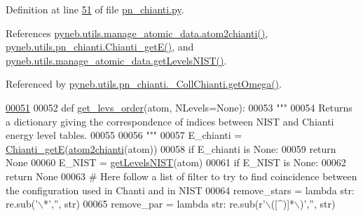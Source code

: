Definition at line \hyperlink{pn__chianti_8py_source_l00051}{51} of file \hyperlink{pn__chianti_8py_source}{pn\-\_\-chianti.\-py}.



References \hyperlink{manage__atomic__data_8py_source_l00009}{pyneb.\-utils.\-manage\-\_\-atomic\-\_\-data.\-atom2chianti()}, \hyperlink{pn__chianti_8py_source_l00030}{pyneb.\-utils.\-pn\-\_\-chianti.\-Chianti\-\_\-get\-E()}, and \hyperlink{manage__atomic__data_8py_source_l00606}{pyneb.\-utils.\-manage\-\_\-atomic\-\_\-data.\-get\-Levels\-N\-I\-S\-T()}.



Referenced by \hyperlink{pn__chianti_8py_source_l00507}{pyneb.\-utils.\-pn\-\_\-chianti.\-\_\-\-Coll\-Chianti.\-get\-Omega()}.


\begin{DoxyCode}
\hypertarget{namespacepyneb_1_1utils_1_1pn__chianti_l00051}{}\hyperlink{namespacepyneb_1_1utils_1_1pn__chianti_aa5ac8c15155a7a63ddaefa054349ea16}{00051} 
00052 \textcolor{keyword}{def }\hyperlink{namespacepyneb_1_1utils_1_1pn__chianti_aa5ac8c15155a7a63ddaefa054349ea16}{get\_levs\_order}(atom, NLevels=None):
00053     \textcolor{stringliteral}{"""}
00054 \textcolor{stringliteral}{    Returns a dictionary giving the correspondence of indices between NIST and Chianti energy level tables.}
00055 \textcolor{stringliteral}{    }
00056 \textcolor{stringliteral}{    """}
00057     E\_chianti = \hyperlink{namespacepyneb_1_1utils_1_1pn__chianti_af2ab54887a9b6970ef047eb14a81357d}{Chianti\_getE}(\hyperlink{namespacepyneb_1_1utils_1_1manage__atomic__data_a2c05deb31d8bc74727659c88846651a1}{atom2chianti}(atom))
00058     \textcolor{keywordflow}{if} E\_chianti \textcolor{keywordflow}{is} \textcolor{keywordtype}{None}:
00059         \textcolor{keywordflow}{return} \textcolor{keywordtype}{None}
00060     E\_NIST = \hyperlink{namespacepyneb_1_1utils_1_1manage__atomic__data_ad09376e8676854d44680ae14210b5589}{getLevelsNIST}(atom)
00061     \textcolor{keywordflow}{if} E\_NIST \textcolor{keywordflow}{is} \textcolor{keywordtype}{None}:
00062         \textcolor{keywordflow}{return} \textcolor{keywordtype}{None}
00063     \textcolor{comment}{# Here follow a list of filter to try to find coincidence between the configuration used in Chanti and
       in NIST}
00064     remove\_stars = \textcolor{keyword}{lambda} str: re.sub(\textcolor{stringliteral}{'\(\backslash\)*'},\textcolor{stringliteral}{''}, str)
00065     remove\_par = \textcolor{keyword}{lambda} str: re.sub(\textcolor{stringliteral}{r'\(\backslash\)([^)]*\(\backslash\))'},\textcolor{stringliteral}{''}, str)

\end{DoxyCode}
